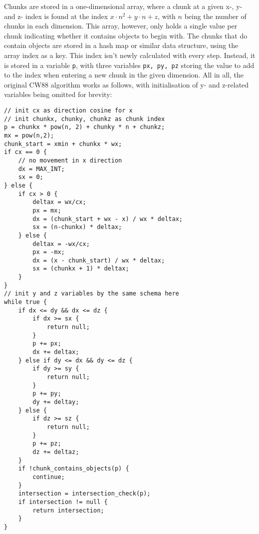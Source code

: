 \newline
Chunks are stored in a one-dimensional array,
where a chunk at a given x-, y- and z- index is found at the index \(x \cdot n^2 + y \cdot n + z\),
with \(n\) being the number of chunks in each dimension.
This array, however, only holds a single value per chunk indicating whether it contains objects to begin with.
The chunks that do contain objects are stored in a hash map or similar data structure,
using the array index as a key.
\newline
This index isn't newly calculated with every step.
Instead, it is stored in a variable \verb|p|,
with three variables \verb|px, py, pz| storing the value to add to the index when entering a new chunk in the given dimension.
\newline
All in all, the original CW88 algorithm works as follows,
with initialisation of y- and z-related variables being omitted for brevity:

\begin{verbatim}
// init cx as direction cosine for x
// init chunkx, chunky, chunkz as chunk index
p = chunkx * pow(n, 2) + chunky * n + chunkz;
mx = pow(n,2);
chunk_start = xmin + chunkx * wx;
if cx == 0 {
    // no movement in x direction
    dx = MAX_INT;
    sx = 0;
} else {
    if cx > 0 {
        deltax = wx/cx;
        px = mx;
        dx = (chunk_start + wx - x) / wx * deltax;
        sx = (n-chunkx) * deltax;
    } else {
        deltax = -wx/cx;
        px = -mx;
        dx = (x - chunk_start) / wx * deltax;
        sx = (chunkx + 1) * deltax;
    }
}
// init y and z variables by the same schema here
while true {
    if dx <= dy && dx <= dz {
        if dx >= sx {
            return null;
        }
        p += px;
        dx += deltax;
    } else if dy <= dx && dy <= dz {
        if dy >= sy {
            return null;
        }
        p += py;
        dy += deltay;
    } else {
        if dz >= sz {
            return null;
        }
        p += pz;
        dz += deltaz;
    }
    if !chunk_contains_objects(p) {
        continue;
    }
    intersection = intersection_check(p);
    if intersection != null {
        return intersection;
    }
}
\end{verbatim}

